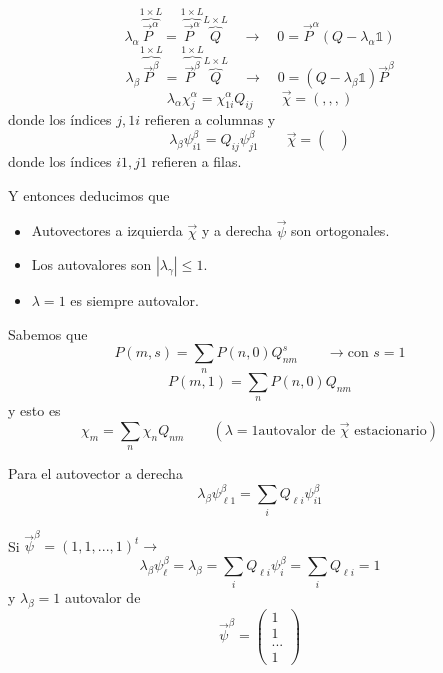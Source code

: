 \documentclass[10pt,oneside]{CBFT_book}
\begin{document}
\[
	\lambda_\alpha \overbrace{\vec{P}^\alpha}^{1\times L} =  
	\overbrace{\vec{P}^\alpha}^{1\times L} \overbrace{Q}^{L\times L}
	\quad \rightarrow \quad 0 = \vec{P}^\alpha (Q-\lambda_\alpha \mathbb{1}) 
\]
\[
	\lambda_\beta \overbrace{\vec{P}^\beta}^{1\times L} = 
	\overbrace{\vec{P}^\beta}^{1\times L} \overbrace{Q}^{L\times L}
	\quad \rightarrow \quad  0 = (Q-\lambda_\beta \mathbb{1}) \vec{P}^\beta
\]
\[
	\lambda_\alpha \chi_j^\alpha = \chi_{1i}^\alpha Q_{ij} \qquad \vec{\chi} = (,,,)
\]
donde los índices $j,1i$ refieren a columnas y
\[
	\lambda_\beta \psi_{i1}^\beta = Q_{ij} \psi_{j1}^\beta \qquad \vec{\chi} = 
\begin{pmatrix}
                                                                            \\
                                                                            \\
                                                                            
                                                                           \end{pmatrix}
\]
donde los índices $i1,j1$ refieren a filas.


Y entonces deducimos que 
\begin{itemize}
 \item Autovectores a izquierda $\vec{\chi}$ y a derecha $\vec{\psi}$ son ortogonales.
 \item Los autovalores son $|\lambda_\gamma|\leq 1$.
 \item $\lambda = 1$ es siempre autovalor.
\end{itemize}

Sabemos que 
\[
	P(m,s) = \sum_n P(n,0) Q^s_{nm} \qquad \rightarrow \text{con $s=1$}
\]
\[
	P(m,1) = \sum_n P(n,0) Q_{nm}
\]
y esto es 
\[
	\chi_m = \sum_n \chi_n Q_{nm}  \qquad (\lambda=1 \text{autovalor de $\vec{\chi}$ 
estacionario})
\]

Para el autovector a derecha 
\[
	\lambda_\beta \psi_{\ell 1}^\beta = \sum_i Q_{\ell i} \psi_{i1}^\beta
\]

Si $ \vec{\psi}^\beta = (1,1,...,1)^t\rightarrow$
\[
	\lambda_\beta \psi_\ell^\beta = \lambda_\beta = \sum_i Q_{\ell i} \psi_i^\beta
	= \sum_i Q_{\ell i} = 1
\]
y $\lambda_\beta=1$ autovalor de 
\[
	\vec{\psi}^\beta = \begin{pmatrix}
	 1\\
	 1\\
	 ...\\
	 1
	\end{pmatrix}
\]
\end{document}
